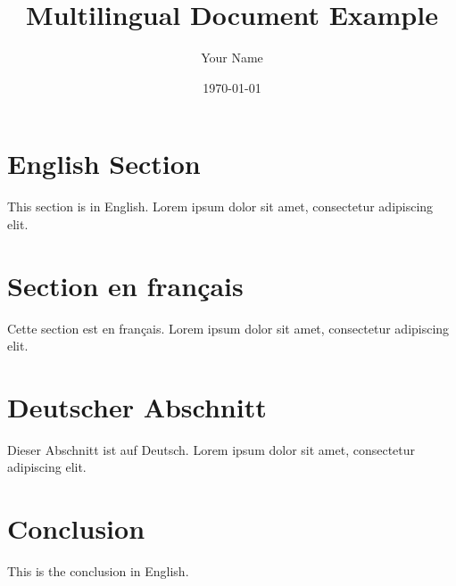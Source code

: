 \documentclass[11pt,a4paper]{article}
\title{Multilingual Document Example}
\author{Your Name}
\date{\today}
\begin{document}
\maketitle

\section{English Section}
This section is in English. Lorem ipsum dolor sit amet, consectetur adipiscing elit.

\section{Section en français}
Cette section est en français. Lorem ipsum dolor sit amet, consectetur adipiscing elit.

\section{Deutscher Abschnitt}
Dieser Abschnitt ist auf Deutsch. Lorem ipsum dolor sit amet, consectetur adipiscing elit.

\section{Conclusion}
This is the conclusion in English.
\end{document}
